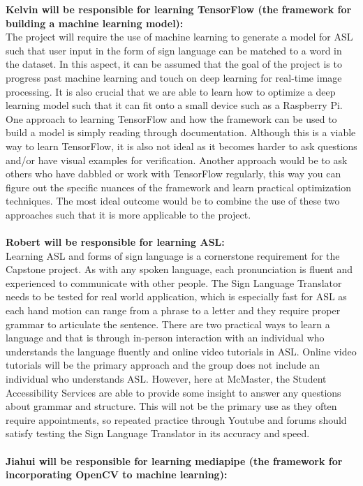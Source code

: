 \documentclass[12pt]{article}
\begin{document}
\textbf{Kelvin will be responsible for learning TensorFlow (the framework for building a machine learning model):}\\
The project will require the use of machine learning to generate a model for ASL such that user input in the form of sign language
can be matched to a word in the dataset. In this aspect, it can be assumed that the goal of the project is to progress past machine
learning and touch on deep learning for real-time image processing. It is also crucial that we are able to learn how to optimize a deep
learning model such that it can fit onto a small device such as a Raspberry Pi. One approach to learning TensorFlow and how the framework
can be used to build a model is simply reading through documentation. Although this is a viable way to learn TensorFlow, it is also not
ideal as it becomes harder to ask questions and/or have visual examples for verification. Another approach would be to ask others who
have dabbled or work with TensorFlow regularly, this way you can figure out the specific nuances of the framework and learn practical
optimization techniques. The most ideal outcome would be to combine the use of these two approaches such that it is more applicable to the project.\\
~\\
\textbf{Robert will be responsible for learning ASL:}\\
Learning ASL and forms of sign language is a cornerstone requirement for the Capstone project. As with any spoken language, each pronunciation is fluent and 
experienced to communicate with other people. The Sign Language Translator needs to be tested for real world application, which is especially fast for ASL 
as each hand motion can range from a phrase to a letter and they require proper grammar to articulate the sentence. There are two practical ways to learn 
a language and that is through in-person interaction with an individual who understands the language fluently and online video tutorials in ASL. Online 
video tutorials will be the primary approach and the group does not include an individual who understands ASL. However, here at McMaster, 
the Student Accessibility Services are able to provide some insight to answer any questions about grammar and structure. This will not be the 
primary use as they often require appointments, so repeated practice through Youtube and forums should satisfy testing the Sign Language Translator 
in its accuracy and speed.\\
~\\
\textbf{Jiahui will be responsible for learning mediapipe (the framework for incorporating OpenCV to machine learning):}\\
\end{document}
